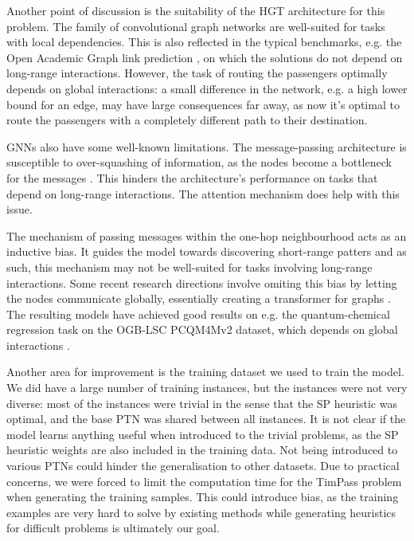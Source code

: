 \documentclass[english, 12pt, a4paper, sci, utf8, a-2b, online]{aaltothesis}
\begin{document}
Another point of discussion is the suitability of the HGT architecture for this problem. The family of convolutional graph networks are well-suited for tasks with local dependencies. This is also reflected in the typical benchmarks, e.g. the Open Academic Graph link prediction \cite{oag-dataset}, on which the solutions do not depend on long-range interactions. However, the task of routing the passengers optimally depends on global interactions: a small difference in the network, e.g. a high lower bound for an edge, may have large consequences far away, as now it's optimal to route the passengers with a completely different path to their destination.

GNNs also have some well-known limitations. The message-passing architecture is susceptible to over-squashing of information, as the nodes become a bottleneck for the messages \cite{alon2020bottleneck}. This hinders the architecture's performance on tasks that depend on long-range interactions. The attention mechanism does help with this issue.

The mechanism of passing messages within the one-hop neighbourhood acts as an inductive bias. It guides the model towards discovering short-range patters and as such, this mechanism may not be well-suited for tasks involving long-range interactions. Some recent research directions involve omiting this bias by letting the nodes communicate globally, essentially creating a transformer for graphs \cite{ying2021transformers,hussain2022global}. The resulting models have achieved good results on e.g. the quantum-chemical
regression task on the OGB-LSC PCQM4Mv2 dataset, which depends on global interactions \cite{hu2021ogblsc}.

Another area for improvement is the training dataset we used to train the model. We did have a large number of training instances, but the instances were not very diverse: most of the instances were trivial in the sense that the SP heuristic was optimal, and the base PTN was shared between all instances. It is not clear if the model learns anything useful when introduced to the trivial problems, as the SP heuristic weights are also included in the training data. Not being introduced to various PTNs could hinder the generalisation to other datasets. Due to practical concerns, we were forced to limit the computation time for the TimPass problem when generating the training samples. This could introduce bias, as the training examples are very hard to solve by existing methods while generating heuristics for difficult problems is ultimately our goal.
\end{document}
